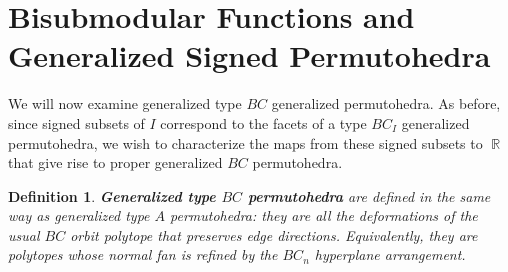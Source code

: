 \documentclass[12pt]{amsart}
\newtheorem{definition}{Definition}
\numberwithin{equation}{section}
\newcommand{\RR}{\operatorname{\mathbb{R}}}
\begin{document}





\section{Bisubmodular Functions and Generalized Signed Permutohedra}



We will now examine generalized type $BC$ generalized permutohedra. As before, since signed subsets of $I$  correspond
to the facets of a type $BC_I$ generalized permutohedra, we wish to characterize the maps from these signed subsets to $\RR$
that give rise to proper generalized $BC$ permutohedra.  

\begin{definition}  
{\bf Generalized type $BC$ permutohedra } are defined in the same way as generalized type $A$ permutohedra: they are all the deformations
of the usual $BC$ orbit polytope that preserves edge directions.   Equivalently, they are polytopes whose normal fan is refined by
the $BC_n$ hyperplane arrangement. 
\end{definition}
\end{document}
